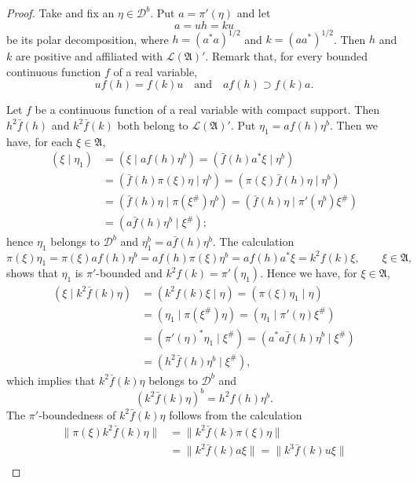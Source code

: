 \documentclass[12pt,b5paper,twoside]{article}
\theoremstyle{takesaki}
\numberwithin{equation}{section}
\begin{document}
\begin{proof}
Take and fix an $\eta\in\mathcal D^b$.  Put $a=\pi'(\eta)$ and let
\[
  a=uh=ku
\]
be its polar decomposition, where $h=(a^*a)^{1/2}$ and
$k=(aa^*)^{1/2}$.  Then $h$ and $k$ are positive and affiliated with
$\mathcal L(\mathfrak A)'$.  Remark that, for every bounded continuous
function $f$ of a real variable,
\begin{equation}
  uf(h)=f(k)u
  \quad\text{and}\quad
  af(h)\supset f(k)a.
  \tag{3.5}\label{eq:3.5}
\end{equation}

Let $f$ be a continuous function of a real variable with compact
support.  Then $h^2\bar f(h)$ and $k^2\bar f(k)$ both belong to
$\mathcal L(\mathfrak A)'$.  Put $\eta_1=af(h)\eta^b$.  Then we have,
for each $\xi\in\mathfrak A$,
\begin{align*}
 (\xi\mid\eta_1)
  &=(\xi\mid af(h)\eta^b)
   =(\bar f(h)a^*\xi\mid\eta^b)\\
  &=(\bar f(h)\pi(\xi)\eta\mid\eta^b)
   =(\pi(\xi)\bar f(h)\eta\mid\eta^b)\\
  &=(\bar f(h)\eta\mid\pi(\xi^\#)\eta^b)
   =(\bar f(h)\eta\mid\pi'(\eta^b)\xi^\#)\\
  &=(a\bar f(h)\eta^b\mid\xi^\#);
\end{align*}
hence $\eta_1$ belongs to $\mathcal D^b$ and
$\eta_1^b=a\bar f(h)\eta^b$.  The calculation
\[
 \pi(\xi)\eta_1
 =\pi(\xi)af(h)\eta^b
 =af(h)\pi(\xi)\eta^b
 =af(h)a^*\xi
 =k^2f(k)\xi,\qquad \xi\in\mathfrak A,
\]
shows that $\eta_1$ is $\pi'$-bounded and
$k^2f(k)=\pi'(\eta_1)$.  Hence we have, for $\xi\in\mathfrak A$,
\begin{align*}
 (\xi\mid k^2\bar f(k)\eta)
  &=(k^2f(k)\xi\mid\eta)
   =(\pi(\xi)\eta_1\mid\eta)\\
  &=(\eta_1\mid\pi(\xi^\#)\eta)
   =(\eta_1\mid\pi'(\eta)\xi^\#)\\
  &=(\pi'(\eta)^*\eta_1\mid\xi^\#)
   =(a^*a\bar f(h)\eta^b\mid\xi^\#)\\
  &=(h^2\bar f(h)\eta^b\mid\xi^\#),
\end{align*}
which implies that $k^2\bar f(k)\eta$ belongs to $\mathcal D^b$ and
\[
 (k^2\bar f(k)\eta)^b=h^2f(h)\eta^b.
\]
The $\pi'$-boundedness of $k^2\bar f(k)\eta$ follows from the
calculation
\begin{align*}
 \|\pi(\xi)k^2\bar f(k)\eta\|
   &=\|k^2\bar f(k)\pi(\xi)\eta\|\\
   &=\|k^2\bar f(k)a\xi\|
    =\|k^3\bar f(k)u\xi\|\\

\end{align*}
\end{proof}
\end{document}
